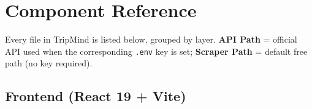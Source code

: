 \documentclass[11pt,a4paper]{article}
\begin{document}
\newpage

\section{Component Reference}

Every file in TripMind is listed below, grouped by layer.
\textbf{API Path} = official API used when the corresponding \texttt{.env} key is set;
\textbf{Scraper Path} = default free path (no key required).

\subsection{Frontend (React 19 + Vite)}
\end{document}

